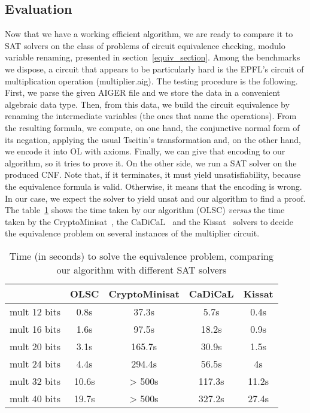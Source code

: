 \documentclass[a4paper, 11pt]{article}
\begin{document}
    \subsection{Evaluation}
    Now that we have a working efficient algorithm, we are ready to compare it to SAT solvers on the
    class of problems of circuit equivalence checking, modulo variable renaming, presented in 
    section~\ref{equiv_section}. Among the benchmarks we dispose, a circuit that appears to be
    particularly hard is the EPFL's circuit of multiplication operation (\textsf{multiplier.aig}). 
    The testing procedure is the
    following. First, we parse the given AIGER file and we store the data in a convenient algebraic
    data type. Then, from this data, we build the circuit equivalence by renaming the intermediate
    variables (the ones that name the operations). From the resulting formula, we compute, on one hand, 
    the conjunctive normal form of its negation, applying the usual Tseitin's transformation and, on 
    the other hand, we
    encode it into OL with axioms. Finally, we can give that encoding to our algorithm, so it tries
    to prove it. On the other side, we run a SAT solver on the produced CNF. Note that, if it terminates,
    it must yield unsatisfiability, because the equivalence formula is valid. Otherwise, it means that
    the encoding is wrong. 
    In our case, we expect the solver to yield unsat and our algorithm to find a proof.
    The table~\ref{benchmark_equiv} shows the time taken by our algorithm (OLSC) \textit{versus} the time
    taken by the CryptoMinisat~\cite{10.1007/978-3-642-02777-2_24},
    the CaDiCaL~\cite{BiereFallerFazekasFleuryFroleyks-CAV24} and the 
    Kissat~\cite{BiereFallerFazekasFleuryFroleyksPollitt-SAT-Competition-2024-solvers} solvers to decide 
    the equivalence problem on several instances of the multiplier circuit.
    \begin{table}[h] 
	    \begin{center}
		    \begin{tabular}{|c||c|c|c|c|}
			    \hline
			     &OLSC&CryptoMinisat&CaDiCaL&Kissat\\
			     \hline\hline
			     mult 12 bits&0.8s&37.3s&5.7s&0.4s\\
			     mult 16 bits&1.6s&97.5s&18.2s&0.9s\\
			     mult 20 bits&3.1s&165.7s&30.9s&1.5s\\
			     mult 24 bits&4.4s&294.4s&56.5s&4s\\
			     mult 32 bits&10.6s&> 500s&117.3s&11.2s\\
			     mult 40 bits&19.7s&> 500s&327.2s&27.4s\\
			     \hline
		    \end{tabular}
	    \end{center}
	    \caption{Time (in seconds) to solve the equivalence problem, comparing our algorithm with
	    different SAT solvers}
	    \label{benchmark_equiv}
    \end{table}
\end{document}
